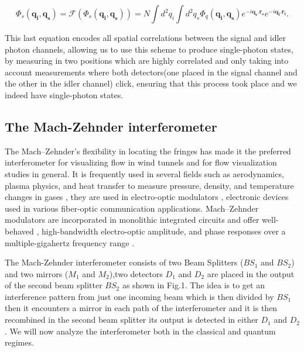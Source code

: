 \documentclass[12pt]{article}
\begin{document}
\begin{equation}
\Phi_{s}(\mathbf{q_{i}},\mathbf{q_{s}})=\mathscr{F}(\Phi_{s}(\mathbf{q_{i}},\mathbf{q_{s}}))=N \int d^{2}q_{i} \int d^{2}q_{s} \Phi_{q}(\mathbf{q_{i}},\mathbf{q_{s}}) e^{-i \mathbf{q_{s}}.\mathbf{r_{s}}} e^{-i \mathbf{q_{i}}.\mathbf{r_{i}}}.
\end{equation}

This last equation encodes all spatial correlations between the signal and idler photon channels, allowing us to use this scheme to produce single-photon states, by measuring in two positions which are highly correlated and only taking into account measurements where both detectors(one placed in the signal channel and the other in the idler channel) click, ensuring that this process took place and we indeed have single-photon states.

\subsection{The Mach-Zehnder interferometer }


 The Mach–Zehnder's flexibility in locating the fringes has made it the preferred interferometer for visualizing flow in wind tunnels \cite{10} and for flow visualization studies in general. It is frequently used in several fields such as aerodynamics, plasma physics, and heat transfer to measure pressure, density, and temperature changes in gases \cite{11}, they are used in electro-optic modulators \cite{ackerman}, electronic devices used in various fiber-optic communication applications. Mach–Zehnder modulators are incorporated in monolithic integrated circuits and offer well-behaved \cite{studenkov}, high-bandwidth electro-optic amplitude, and phase responses over a multiple-gigahertz frequency range \cite{capmany}.

The Mach-Zehnder interferometer consists of two Beam Splitters ($BS_{1}$ and $BS_{2}$) and two mirrors ($M_{1}$ and $M_{2}$),two detectors $D_{1}$ and $D_{2}$ are placed in the output of the second beam splitter $BS_{2}$ as shown in Fig.1. The idea is to get an interference pattern from just one incoming beam which is then divided by $BS_{1}$ then it encounters a mirror in each path of the interferometer and it is then recombined in the second beam splitter its output is detected in either $D_{1}$ and $D_{2}$. We will now analyze the interferometer both in the classical and quantum regimes.
\end{document}
